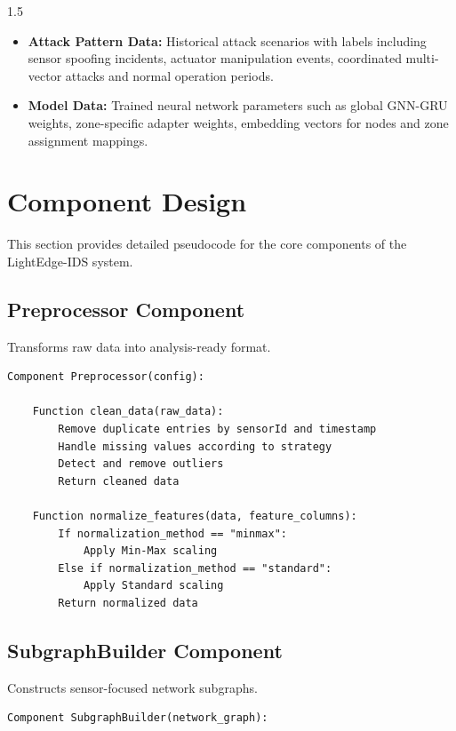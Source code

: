 \begin{spacing}{1.5}
\begin{itemize}
\item \textbf{Attack Pattern Data:} Historical attack scenarios with labels including sensor spoofing incidents, actuator manipulation events, coordinated multi-vector attacks and normal operation periods.

\item \textbf{Model Data:} Trained neural network parameters such as global GNN-GRU weights, zone-specific adapter weights, embedding vectors for nodes and zone assignment mappings.

\end{itemize}
\newpage

\section{Component Design}

This section provides detailed pseudocode for the core components of the LightEdge-IDS system.

\subsection{Preprocessor Component}

Transforms raw data into analysis-ready format.

\begin{lstlisting}[basicstyle=\ttfamily\small, breaklines=true, frame=single]
Component Preprocessor(config):

    Function clean_data(raw_data):
        Remove duplicate entries by sensorId and timestamp
        Handle missing values according to strategy
        Detect and remove outliers
        Return cleaned data

    Function normalize_features(data, feature_columns):
        If normalization_method == "minmax":
            Apply Min-Max scaling
        Else if normalization_method == "standard":
            Apply Standard scaling
        Return normalized data

\end{lstlisting}


\subsection{SubgraphBuilder Component}

Constructs sensor-focused network subgraphs.

\begin{lstlisting}[basicstyle=\ttfamily\small, breaklines=true, frame=single]
Component SubgraphBuilder(network_graph):


\end{lstlisting}
\end{spacing}
